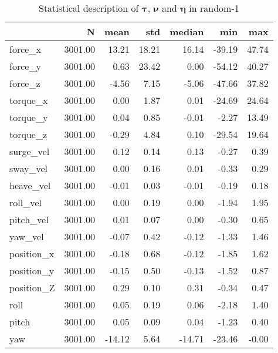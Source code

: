 \begin{table}[hb]
\centering
\caption{Statistical description of $\boldsymbol{\tau}$, $\boldsymbol{\nu}$ and $\boldsymbol{\eta}$ in random-1}
\label{tab:description-random-1}
\begin{tabular}{lrrrrrr}
\toprule
{} &       N &   mean &   std & median &    min &   max \\
\midrule
force\_x    & 3001.00 &  13.21 & 18.21 &  16.14 & -39.19 & 47.74 \\
force\_y    & 3001.00 &   0.63 & 23.42 &   0.00 & -54.12 & 40.27 \\
force\_z    & 3001.00 &  -4.56 &  7.15 &  -5.06 & -47.66 & 37.82 \\
torque\_x   & 3001.00 &   0.00 &  1.87 &   0.01 & -24.69 & 24.64 \\
torque\_y   & 3001.00 &   0.04 &  0.85 &  -0.01 &  -2.27 & 13.49 \\
torque\_z   & 3001.00 &  -0.29 &  4.84 &   0.10 & -29.54 & 19.64 \\
surge\_vel  & 3001.00 &   0.12 &  0.14 &   0.13 &  -0.27 &  0.39 \\
sway\_vel   & 3001.00 &   0.00 &  0.16 &   0.01 &  -0.33 &  0.29 \\
heave\_vel  & 3001.00 &  -0.01 &  0.03 &  -0.01 &  -0.19 &  0.18 \\
roll\_vel   & 3001.00 &   0.00 &  0.19 &   0.00 &  -1.94 &  1.95 \\
pitch\_vel  & 3001.00 &   0.01 &  0.07 &   0.00 &  -0.30 &  0.65 \\
yaw\_vel    & 3001.00 &  -0.07 &  0.42 &  -0.12 &  -1.33 &  1.46 \\
position\_x & 3001.00 &  -0.18 &  0.68 &  -0.12 &  -1.85 &  1.62 \\
position\_y & 3001.00 &  -0.15 &  0.50 &  -0.13 &  -1.52 &  0.87 \\
position\_Z & 3001.00 &   0.29 &  0.10 &   0.31 &  -0.34 &  0.47 \\
roll       & 3001.00 &   0.05 &  0.19 &   0.06 &  -2.18 &  1.40 \\
pitch      & 3001.00 &   0.05 &  0.09 &   0.04 &  -1.23 &  0.40 \\
yaw        & 3001.00 & -14.12 &  5.64 & -14.71 & -23.46 & -0.00 \\
\bottomrule
\end{tabular}
\end{table}
